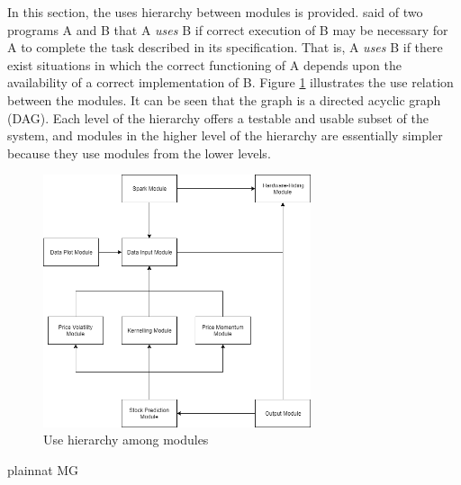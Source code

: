 \documentclass[12pt, titlepage]{article}
\begin{document}
In this section, the uses hierarchy between modules is
provided. \citet{Parnas1978} said of two programs A and B that A {\em uses} B if
correct execution of B may be necessary for A to complete the task described in
its specification. That is, A {\em uses} B if there exist situations in which
the correct functioning of A depends upon the availability of a correct
implementation of B. Figure \ref{FigUH} illustrates the use relation between
the modules. It can be seen that the graph is a directed acyclic graph
(DAG). Each level of the hierarchy offers a testable and usable subset of the
system, and modules in the higher level of the hierarchy are essentially simpler
because they use modules from the lower levels.

\begin{figure}[H]
\centering
\includegraphics[width=0.7\textwidth]{UsesHierarchy.png}

\caption{Use hierarchy among modules}
\label{FigUH}
\end{figure}


 {plainnat}
 {MG}
\end{document}
